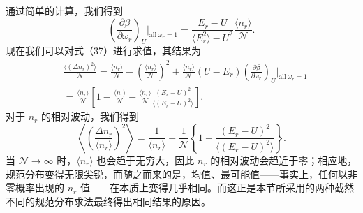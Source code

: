通过简单的计算，我们得到
\begin{equation}\tag{3.2.39}\label{eq:3.2.39}
\left( \frac { \partial \beta } { \partial \omega _ { r } } \right) _ { U } \Big | _ { \mathrm { a l l } \ \omega _ { r } = 1 } = \frac { E _ { r } - U } { \langle E _ { r } ^{2} \rangle - U ^{2} } \frac { \langle n _ { r } \rangle } { \mathcal { N } } .
\end{equation}
现在我们可以对式（37）进行求值，其结果为
\begin{equation}\tag{3.2.40}\label{eq:3.2.40}
\begin{array}{rl} & { \frac { \langle ( \Delta n _ { r } ) ^{2} \rangle } { \mathcal { N } } = \frac { \langle n _ { r } \rangle } { \mathcal { N } } - \left( \frac { \langle n _ { r } \rangle } { \mathcal { N } } \right) ^{2} + \frac { \langle n _ { r } \rangle } { \mathcal { N } } ( U - E _ { r } ) \left( \frac { \partial \beta } { \partial \omega _ { r } } \right) _ { U } \Big | _ { \mathrm { a l l } \ \omega _ { r } = 1 } } \\& { = \frac { \langle n _ { r } \rangle } { \mathcal { N } } \left[ 1 - \frac { \langle n _ { r } \rangle } { \mathcal { N } } - \frac { \langle n _ { r } \rangle } { \mathcal { N } } \frac { ( E _ { r } - U ) ^{2} } { \langle ( E _ { r } - U ) ^{2} \rangle } \right] . } \end{array}
\end{equation}
对于 \(n_{r}\) 的相对波动，我们得到
\begin{equation}\tag{3.2.41}\label{eq:3.2.41}
\left\langle \left( \frac { \Delta n _ { r } } { \langle n _ { r } \rangle } \right) ^{2} \right\rangle = \frac { 1 } { \langle n _ { r } \rangle } - \frac { 1 } { \mathcal { N } } \left\{ 1 + \frac { ( E _ { r } - U ) ^{2} } { \langle ( E _ { r } - U ) ^{2} \rangle } \right\} .
\end{equation}
当 \(\mathcal{N} \rightarrow \infty\) 时，\(\langle n_{r} \rangle\) 也会趋于无穷大，因此 \(n_{r}\) 的相对波动会趋近于零；相应地，规范分布变得无限尖锐，而随之而来的是，均值、最可能值——事实上，任何以非零概率出现的 \(n_{r}\) 值——在本质上变得几乎相同。而这正是本节所采用的两种截然不同的规范分布求法最终得出相同结果的原因。
